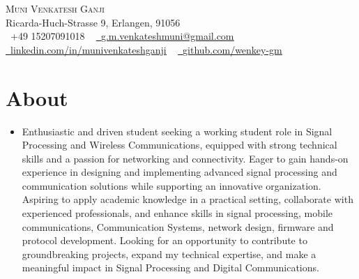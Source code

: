 \documentclass[letterpaper,11pt]{article}
\newcommand{\resumeItem}[1]{
  \item\small{
    {#1 \vspace{-2pt}}
  }
}
\newcommand{\resumeSubHeadingListStart}{\begin{itemize}[leftmargin=0.0in, label={}]}
\newcommand{\resumeSubHeadingListEnd}{\end{itemize}}
\begin{document}

\begin{center}
    {\Huge \scshape Muni Venkatesh Ganji} \\ \vspace{1pt}
    Ricarda-Huch-Strasse 9, Erlangen, 91056 \\ \vspace{1pt}
    \small \raisebox{-0.1\height}\faPhone\ +49 15207091018 ~ \href{mailto:g.m.venkateshmuni@gmail.com}{\raisebox{-0.2\height}\faEnvelope\  \underline{g.m.venkateshmuni@gmail.com}} ~ 
    \href{https://www.linkedin.com/in/muni-venkatesh-ganji/}{\raisebox{-0.2\height}\faLinkedin\ \underline{linkedin.com/in/munivenkateshganji}}  ~
    \href{https://github.com/wenkey-gm}{\raisebox{-0.2\height}\faGithub\ \underline{github.com/wenkey-gm}}
    \vspace{-8pt}
\end{center}

\section{About}
    \resumeSubHeadingListStart
        \resumeItem{Enthusiastic and driven student seeking a working student role in Signal Processing and  Wireless Communications, equipped with strong technical skills and a passion for networking and connectivity. Eager to gain hands-on experience in designing and implementing advanced signal processing and communication solutions while supporting an innovative organization. Aspiring to apply academic knowledge in a practical setting, collaborate with experienced professionals, and enhance skills in signal processing, mobile communications, Communication Systems, network design, firmware and protocol development. Looking for an opportunity to contribute to groundbreaking projects, expand my technical expertise, and make a meaningful impact in Signal Processing and Digital Communications.}
    \resumeSubHeadingListEnd
    \vspace{-16pt}
\end{document}

